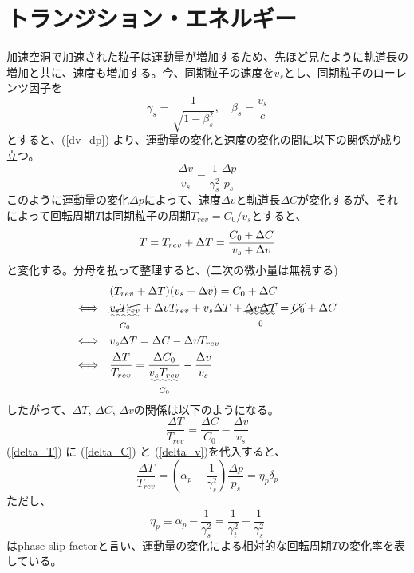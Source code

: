 \documentclass[10pt,a4paper]{jlreq}
\begin{document}
\section{トランジション・エネルギー}
加速空洞で加速された粒子は運動量が増加するため、先ほど見たように軌道長の増加と共に、速度も増加する。今、同期粒子の速度を$v_s$とし、同期粒子のローレンツ因子を
%
\begin{equation}
  \gamma_s = \frac{1}{\sqrt{1 - \beta_s^2}}, \quad \beta_s = \frac{v_s}{c}
\end{equation}
%
とすると、(\ref{dv_dp}) より、運動量の変化と速度の変化の間に以下の関係が成り立つ。
%
\begin{equation}
  \frac{\Delta v}{v_s}=\frac{1}{\gamma_s^2}\frac{\Delta p}{p_s}
  \label{delta_v}
\end{equation}
%
このように運動量の変化$\Delta p$によって、速度$\Delta v$と軌道長$\Delta C$が変化するが、それによって回転周期$T$は同期粒子の周期$T_{rev}=C_0/v_s$とすると、
%
\begin{equation}
  T = T_{rev} + \Delta T = \frac{C_0 + \Delta C}{v_s + \Delta v} \notag
\end{equation}
%
と変化する。分母を払って整理すると、(二次の微小量は無視する)
%
\begin{align}
  & (T_{rev} + \Delta T)(v_s + \Delta v) = C_0 + \Delta C \notag \\
  \Longleftrightarrow\quad & \underset{C_0}{\uwave{\cancel{v_s T_{rev}}}} + \Delta v T_{rev} + v_s \Delta T +
  \underset{0}{\uwave{\cancel{\Delta v \Delta T}}}
  = \cancel{C_0} + \Delta C \notag \\
  \Longleftrightarrow\quad & v_s \Delta T = \Delta C- \Delta v T_{rev} \notag \\
  \Longleftrightarrow\quad & \frac{\Delta T}{T_{rev}} = \frac{\Delta C_0}{\underset{C_0}{\uwave{v_s T_{rev}}}} - \frac{\Delta v}{v_s} \notag
\end{align}
%
したがって、$\Delta T$, $\Delta C$, $\Delta v$の関係は以下のようになる。
%
\begin{equation}
  \frac{\Delta T}{T_{rev}} = \frac{\Delta C}{C_0} - \frac{\Delta v}{v_s}
  \label{delta_T}
\end{equation}
%
(\ref{delta_T}) に (\ref{delta_C}) と (\ref{delta_v})を代入すると、
%
\begin{equation}
  \frac{\Delta T}{T_{rev}} = \left(\alpha_p - \frac{1}{\gamma_s^2}\right)\frac{\Delta p}{p_s} = \eta_p \delta_p
  \label{deltat_eta_deltap}
\end{equation}
%
ただし、
%
\begin{equation}
  \eta_p \equiv \alpha_p - \frac{1}{\gamma_s^2} = \frac{1}{\gamma_t^2} - \frac{1}{\gamma_s^2}
  \label{alppha_slip}
\end{equation}
%
はphase slip factorと言い、運動量の変化による相対的な回転周期$T$の変化率を表している。
%
\end{document}
